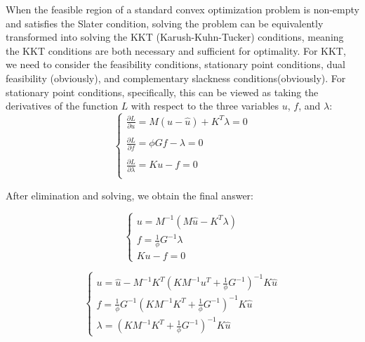 \documentclass{article}
\begin{document}
When the feasible region of a standard convex optimization problem is non-empty and satisfies the Slater condition, solving the problem can be equivalently transformed into solving the KKT (Karush-Kuhn-Tucker) conditions, meaning the KKT conditions are both necessary and sufficient for optimality. For KKT, we need to consider the feasibility conditions, stationary point conditions, dual feasibility (obviously), and complementary slackness conditions(obviously). For stationary point conditions, specifically, this can be viewed as taking the derivatives of the function \( L \) with respect to the three variables \( u \), \( f \), and \( \lambda \):
\begin{equation}
\begin{cases}
    \frac{\partial L}{\partial u} = M(u-\hat{u})+K^T\lambda=0\\
    \\
    \frac{\partial L}{\partial f} = \phi Gf-\lambda=0\\
    \\
    \frac{\partial L}{\partial \lambda} = Ku-f=0\\
\end{cases}
\end{equation}

After elimination and solving, we obtain the final answer:

\begin{equation}
\begin{cases}
    u = M^{-1}(M\hat{u}-K^T\lambda)\\
    f = \frac{1}{\phi}G^{-1}\lambda\\
    Ku-f=0
\end{cases}
\end{equation}

\begin{equation}
\begin{cases}
    u = \hat{u}-M^{-1}K^T(KM^{-1}u^T+\frac{1}{\phi}G^{-1})^{-1}K\hat{u}\\
    f = \frac{1}{\phi}G^{-1}(KM^{-1}K^T+\frac{1}{\phi}G^{-1})^{-1}K\hat{u}\\
    \lambda = (KM^{-1}K^T+\frac{1}{\phi}G^{-1})^{-1}K\hat{u}
\end{cases}
\end{equation}
\end{document}
